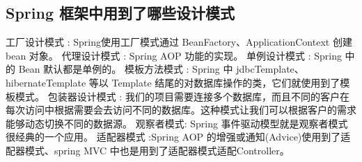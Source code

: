 \documentclass[../../../interview-questions.tex]{subfiles}
\begin{document}
\subsection{Spring 框架中用到了哪些设计模式}

工厂设计模式 : Spring使用工厂模式通过 BeanFactory、ApplicationContext 创建 bean 对象。
代理设计模式 : Spring AOP 功能的实现。
单例设计模式 : Spring 中的 Bean 默认都是单例的。
模板方法模式 : Spring 中 jdbcTemplate、hibernateTemplate 等以 Template 结尾的对数据库操作的类，它们就使用到了模板模式。
包装器设计模式 : 我们的项目需要连接多个数据库，而且不同的客户在每次访问中根据需要会去访问不同的数据库。这种模式让我们可以根据客户的需求能够动态切换不同的数据源。
观察者模式: Spring 事件驱动模型就是观察者模式很经典的一个应用。
适配器模式 :Spring AOP 的增强或通知(Advice)使用到了适配器模式、spring MVC 中也是用到了适配器模式适配Controller。
\end{document}
